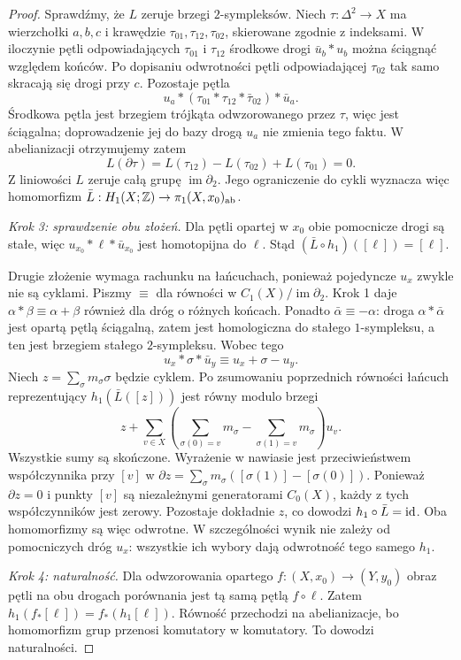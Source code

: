 \begin{proof}
Sprawdźmy, że $L$ zeruje brzegi $2$-sympleksów.
Niech $\tau:\Delta^2\to X$ ma wierzchołki $a,b,c$ i krawędzie
$\tau_{01},\tau_{12},\tau_{02}$, skierowane zgodnie z indeksami.
W iloczynie pętli odpowiadających $\tau_{01}$ i $\tau_{12}$
środkowe drogi $\bar u_b*u_b$ można ściągnąć względem końców.
Po dopisaniu odwrotności pętli odpowiadającej $\tau_{02}$
tak samo skracają się drogi przy $c$. Pozostaje pętla
\[
 u_a*(\tau_{01}*\tau_{12}*\bar\tau_{02})*\bar u_a.
\]
Środkowa pętla jest brzegiem trójkąta odwzorowanego przez $\tau$,
więc jest ściągalna; doprowadzenie jej do bazy drogą $u_a$
nie zmienia tego faktu. W abelianizacji otrzymujemy zatem
\[
 L(\partial\tau)
 =L(\tau_{12})-L(\tau_{02})+L(\tau_{01})=0.
\]
Z liniowości $L$ zeruje całą grupę $\operatorname{im}\partial_2$.
Jego ograniczenie do cykli wyznacza więc homomorfizm
$\bar L:H_1(X;\mathbb{Z})\to\pi_1(X,x_0)_{\mathrm{ab}}$.

\emph{Krok 3: sprawdzenie obu złożeń.}
Dla pętli opartej w $x_0$ obie pomocnicze drogi są stałe,
więc $u_{x_0}*\ell*\bar u_{x_0}$ jest homotopijna do $\ell$.
Stąd $(\bar L\circ h_1)([\ell])=[\ell]$.

Drugie złożenie wymaga rachunku na łańcuchach, ponieważ pojedyncze
$u_x$ zwykle nie są cyklami. Piszmy $\equiv$ dla równości
w $C_1(X)/\operatorname{im}\partial_2$.
Krok 1 daje $\alpha*\beta\equiv\alpha+\beta$ również dla dróg
o różnych końcach. Ponadto $\bar\alpha\equiv-\alpha$:
droga $\alpha*\bar\alpha$ jest opartą pętlą ściągalną,
zatem jest homologiczna do stałego $1$-sympleksu, a ten jest
brzegiem stałego $2$-sympleksu. Wobec tego
\[
 u_x*\sigma*\bar u_y\equiv u_x+\sigma-u_y.
\]
Niech $z=\sum_\sigma m_\sigma\sigma$ będzie cyklem.
Po zsumowaniu poprzednich równości łańcuch reprezentujący
$h_1(\bar L([z]))$ jest równy modulo brzegi
\[
 z+\sum_{v\in X}
 \left(\sum_{\sigma(0)=v}m_\sigma
       -\sum_{\sigma(1)=v}m_\sigma\right)u_v.
\]
Wszystkie sumy są skończone. Wyrażenie w nawiasie jest
przeciwieństwem współczynnika przy $[v]$ w
$\partial z=\sum_\sigma m_\sigma([\sigma(1)]-[\sigma(0)])$.
Ponieważ $\partial z=0$ i punkty $[v]$ są niezależnymi generatorami
$C_0(X)$, każdy z tych współczynników jest zerowy.
Pozostaje dokładnie $z$, co dowodzi $h_1\circ\bar L=\mathrm{id}$.
Oba homomorfizmy są więc odwrotne. W szczególności wynik nie zależy
od pomocniczych dróg $u_x$: wszystkie ich wybory dają odwrotność
tego samego $h_1$.

\emph{Krok 4: naturalność.}
Dla odwzorowania opartego $f:(X,x_0)\to(Y,y_0)$ obraz pętli
na obu drogach porównania jest tą samą pętlą $f\circ\ell$.
Zatem $h_1(f_*[\ell])=f_*(h_1[\ell])$.
Równość przechodzi na abelianizacje, bo homomorfizm grup
przenosi komutatory w komutatory. To dowodzi naturalności.
\end{proof}

